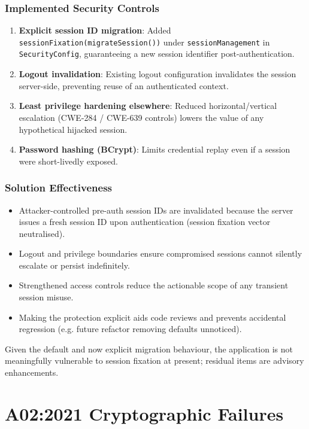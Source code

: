 \documentclass[]{UCD_CS_FYP_Report}
\begin{document}
\subsection{Implemented Security Controls}
\begin{enumerate}
	\item \textbf{Explicit session ID migration}: Added \texttt{sessionFixation(migrateSession())} under \texttt{sessionManagement} in \texttt{SecurityConfig}, guaranteeing a new session identifier post-authentication.
	\item \textbf{Logout invalidation}: Existing logout configuration invalidates the session server-side, preventing reuse of an authenticated context.
	\item \textbf{Least privilege hardening elsewhere}: Reduced horizontal/vertical escalation (CWE-284 / CWE-639 controls) lowers the value of any hypothetical hijacked session.
	\item \textbf{Password hashing (BCrypt)}: Limits credential replay even if a session were short-livedly exposed.
\end{enumerate}

\subsection{Solution Effectiveness}
\begin{itemize}
	\item Attacker-controlled pre-auth session IDs are invalidated because the server issues a fresh session ID upon authentication (session fixation vector neutralised).
	\item Logout and privilege boundaries ensure compromised sessions cannot silently escalate or persist indefinitely.
	\item Strengthened access controls reduce the actionable scope of any transient session misuse.
	\item Making the protection explicit aids code reviews and prevents accidental regression (e.g. future refactor removing defaults unnoticed).
\end{itemize}

Given the default and now explicit migration behaviour, the application is not meaningfully vulnerable to session fixation at present; residual items are advisory enhancements.


\chapter{A02:2021 Cryptographic Failures}
\end{document}

